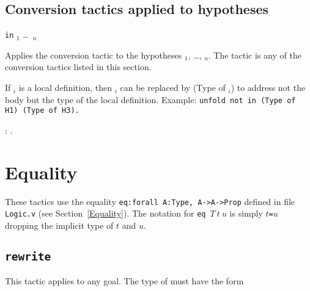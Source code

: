 \begin{coq_example*}

\subsection{Conversion tactics applied to hypotheses}

{\convtactic} {\tt in} \ident$_1$ \dots\ \ident$_n$

Applies the conversion tactic {\convtactic} to the
hypotheses \ident$_1$, \ldots, \ident$_n$. The tactic {\convtactic} is
any of the conversion tactics listed in this section.

If \ident$_i$ is a local definition, then \ident$_i$ can be replaced
by (Type of \ident$_i$) to address not the body but the type of the
local definition. Example: {\tt unfold not in (Type of H1) (Type of H3).}

\begin{ErrMsgs}
\item {} : {\ident}.
\end{ErrMsgs}

\section{Equality}

These tactics use the equality {\tt eq:forall A:Type, A->A->Prop}
defined in file {\tt Logic.v} (see Section~\ref{Equality}). The
notation for {\tt eq}~$T~t~u$ is simply {\tt $t$=$u$} dropping the
implicit type of $t$ and $u$.

\subsection{\tt rewrite \term
\label{rewrite}
}

This tactic applies to any goal. The type of {\term}
must have the form


\end{coq_example*}
